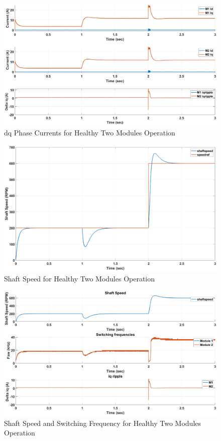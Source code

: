 \documentclass{article}
\begin{document}
\begin{figure}[H]
\centering
\includegraphics[scale=0.35]{SimulationResults/two_modules/healthy/Idq_iqripple.eps}
\caption{dq Phase Currents for Healthy Two Modules Operation}
\label{fig:PhaseCurrentsDqTwoModulesHealthy}
\end{figure}

\begin{figure}[H]
\centering
\includegraphics[scale=0.35]{SimulationResults/two_modules/healthy/speed.eps}
\caption{Shaft Speed for Healthy Two Modules Operation}
\label{fig:ShaftSpeedTwoModulesHealthy}
\end{figure}

\begin{figure}[H]
\centering
\includegraphics[scale=0.35]{SimulationResults/two_modules/healthy/speed_fsw_iqripple.eps}
\caption{Shaft Speed and Switching Frequency for Healthy Two Modules Operation}
\label{fig:ShaftSpeedFswIqRippleTwoModulesHealthy}
\end{figure}
\end{document}
